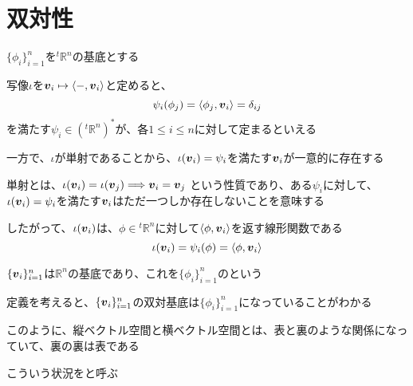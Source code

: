 \documentclass[../../../topic_linear-algebra]{subfiles}
\begin{document}
\sectionline
\section{双対性}

$\{ \phi_i \}_{i=1}^n$を${}^t\mathbb{R}^n$の基底とする

\br

写像$\iota$を$\vb*{v}_i \mapsto \langle -, \vb*{v}_i \rangle$と定めると、
\begin{equation*}
  \psi_i(\phi_j) = \langle \phi_j, \vb*{v}_i \rangle = \delta_{ij}
\end{equation*}
を満たす$\psi_i \in ({}^t\mathbb{R}^n)^*$が、各$1 \leq i \leq n$に対して定まるといえる

\br

一方で、$\iota$が単射であることから、$\iota(\vb*{v}_i) = \psi_i$を満たす$\vb*{v}_i$が一意的に存在する

単射とは、$\iota(\vb*{v}_i) = \iota(\vb*{v}_j) \Longrightarrow \vb*{v}_i = \vb*{v}_j$
という性質であり、ある$\psi_i$に対して、$\iota(\vb*{v}_i) = \psi_i$を満たす$\vb*{v}_i$はただ一つしか存在しないことを意味する

\br

したがって、$\iota(\vb*{v}_i)$は、$\phi \in {}^t\mathbb{R}^n$に対して$\langle \phi, \vb*{v}_i \rangle$を返す線形関数である
\begin{equation*}
  \iota(\vb*{v}_i) = \psi_i(\phi) = \langle \phi, \vb*{v}_i \rangle
\end{equation*}

\br

$\{ \vb*{v}_i \}_{i=1}^n$は$\mathbb{R}^n$の基底であり、これを$\{ \phi_i \}_{i=1}^n$のという

\br

定義を考えると、$\{ \vb*{v}_i \}_{i=1}^n$の双対基底は$\{ \phi_i \}_{i=1}^n$になっていることがわかる

\br

このように、縦ベクトル空間と横ベクトル空間とは、表と裏のような関係になっていて、裏の裏は表である

こういう状況をと呼ぶ
\end{document}
